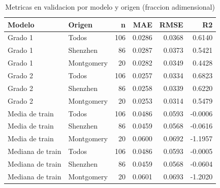 \begin{table}[H]
\centering
\small
\caption{Metricas en validacion por modelo y origen (fraccion adimensional)}
\begin{tabular}{llrrrr}
\toprule
\textbf{Modelo} & \textbf{Origen} & \textbf{n} & \textbf{MAE} & \textbf{RMSE} & \textbf{R2} \\
\midrule
Grado 1 & Todos & 106 & 0.0286 & 0.0368 & 0.6140 \\
Grado 1 & Shenzhen & 86 & 0.0287 & 0.0373 & 0.5421 \\
Grado 1 & Montgomery & 20 & 0.0282 & 0.0349 & 0.4428 \\
Grado 2 & Todos & 106 & 0.0257 & 0.0334 & 0.6823 \\
Grado 2 & Shenzhen & 86 & 0.0258 & 0.0339 & 0.6220 \\
Grado 2 & Montgomery & 20 & 0.0253 & 0.0314 & 0.5479 \\
Media de train & Todos & 106 & 0.0486 & 0.0593 & -0.0006 \\
Media de train & Shenzhen & 86 & 0.0459 & 0.0568 & -0.0616 \\
Media de train & Montgomery & 20 & 0.0600 & 0.0692 & -1.1957 \\
Mediana de train & Todos & 106 & 0.0486 & 0.0593 & -0.0005 \\
Mediana de train & Shenzhen & 86 & 0.0459 & 0.0568 & -0.0604 \\
Mediana de train & Montgomery & 20 & 0.0601 & 0.0693 & -1.2020 \\
\bottomrule
\end{tabular}
\end{table}
